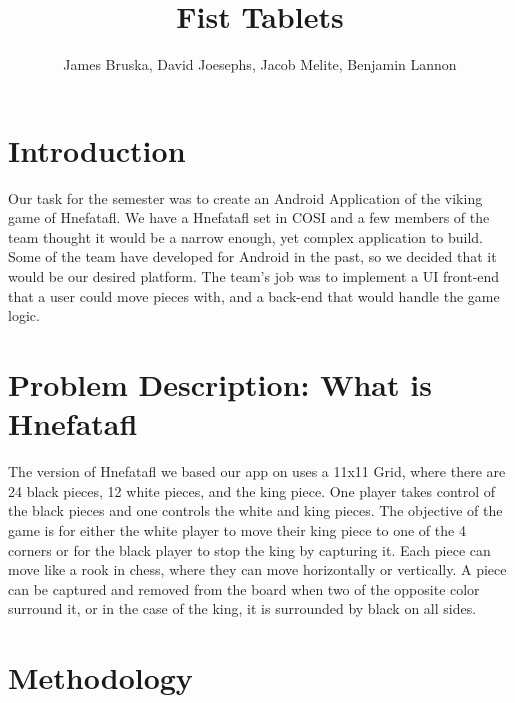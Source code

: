 \documentclass{article}
\title{Fist Tablets}
\author{James Bruska, David Joesephs, Jacob Melite, Benjamin Lannon}
\begin{document}
\maketitle
\tableofcontents


\section{Introduction}
	Our task for the semester was to create an Android Application of the viking game of Hnefatafl. We have a Hnefatafl set in COSI and a few members of the team thought it would be a narrow enough, yet complex application to build. Some of the team have developed for Android in the past, so we decided that it would be our desired platform. The team's job was to implement a UI front-end that a user could move pieces with, and a back-end that would handle the game logic.

\section{Problem Description: What is Hnefatafl}
	The version of Hnefatafl we based our app on uses a 11x11 Grid, where there are 24 black pieces, 12 white pieces, and the king piece. One player takes control of the black pieces and one controls the white and king pieces. The objective of the game is for either the white player to move their king piece to one of the 4 corners or for the black player to stop the king by capturing it. Each piece can move like a rook in chess, where they can move horizontally or vertically. A piece can be captured and removed from the board when two of the opposite color surround it, or in the case of the king, it is surrounded by black on all sides.

\section{Methodology}
\end{document}
